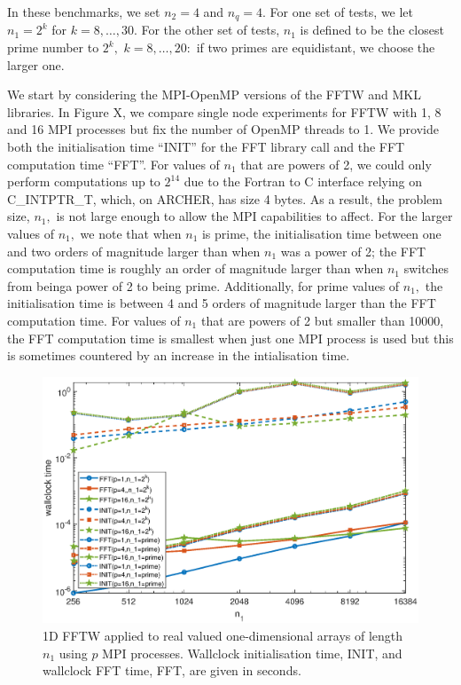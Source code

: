 \documentclass[a4]{article}
\begin{document}
In these benchmarks, we set $n_2=4$ and $n_q=4.$ For one set of tests, we let
 $n_1=2^k$ for $k=8,\ldots,30.$ For the other set of tests, $n_1$ is defined 
to be the closest prime number to $2^k,$ $k=8,\ldots,20:$ if two primes are 
equidistant, we choose the larger one.

We start by considering the MPI-OpenMP versions of the FFTW and MKL libraries.
 In Figure X, we compare single node experiments for FFTW with 1, 8 and 16 
MPI processes but fix the number of OpenMP threads to 1. We provide both the 
initialisation time ``INIT'' for the FFT library call and the FFT computation 
time ``FFT''. For values of $n_1$ that are powers of 2, we could only perform 
computations up to $2^14$ due to the Fortran to C interface relying on 
C\_INTPTR\_T, which, on ARCHER, has size 4 bytes. As a result, the problem size, 
$n_1,$ is not large enough to allow the MPI capabilities to affect. For the 
larger values of $n_1,$ we note that when $n_1$ is prime, the 
initialisation time between one and two orders of magnitude larger than when $n_1$ was a power of 2; the FFT computation time is roughly an order of magnitude 
larger than when $n_1$ switches from beinga power of 2 to being prime. Additionally, for prime values of $n_1,$ the initialisation time is between 4 and 5 orders of magnitude larger than the FFT computation time. For values of $n_1$ that are powers of 2 but smaller than 10000, the FFT computation time is smallest when just one  MPI process is used but this is sometimes countered by an increase in the intialisation time.

\begin{figure}[!htbp]
\begin{center}
 \includegraphics[width=.9\textwidth, height=0.42\textheight]{FFTW1D_times_fig.eps}
\caption{1D FFTW applied to real valued one-dimensional arrays of length $n_1$ using $p$ MPI processes. Wallclock initialisation time, INIT, and wallclock FFT time, FFT, are given in seconds.}
\label{Fig:fftw1d_times}
\end{center}
\end{figure}
\end{document}
